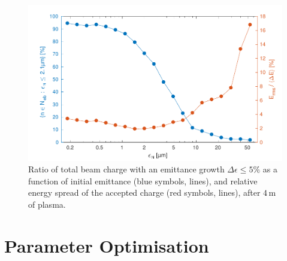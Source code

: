 \documentclass[aps,prstab,reprint,amsmath,amssymb,groupedaddress]{revtex4-1}
\newcommand{\unit}[1]{\,\mathrm{#1}}
\begin{document}
\begin{figure}[hbt]
    \includegraphics[width=\linewidth,trim={2mm 0mm 2mm 0mm},clip]{figures/beamQualityEmittance}
    \caption{\label{Fig:BeamQEmit} Ratio of total beam charge with an emittance growth $\Delta\epsilon \leq 5\%$ as a
        function of initial emittance (blue symbols, lines), and relative energy spread of the accepted charge (red
        symbols, lines), after $4\unit{m}$ of plasma.}
\end{figure}

\section{Parameter Optimisation}\label{S:PO}
\end{document}
